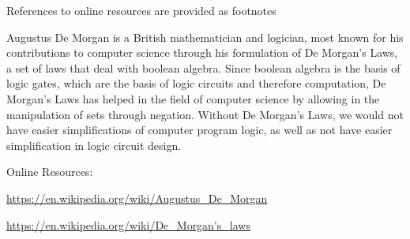 \documentclass{article}
\begin{document}
\clearpage
\header
\item[] References to online resources are provided as footnotes
\item[]Augustus De Morgan is a British mathematician and logician, most known for his contributions to computer science through his formulation of De Morgan's Laws, a set of laws that deal with boolean algebra. Since boolean algebra is the basis of logic gates, which are the basis of logic circuits and therefore computation, De Morgan's Laws has helped in the field of computer science by allowing in the manipulation of sets through negation. Without De Morgan's Laws, we would not have easier simplifications of computer program logic, as well as not have easier simplification in logic circuit design.
\item[]
\item[]
\item[] 
\item[]
\item[] 
\item[] 
\item[]
\item[] 
\item[] 
\item[]
\item[] 
\item[] 
\item[]Online Resources:
\item[]\url{https://en.wikipedia.org/wiki/Augustus_De_Morgan}
\item[]\url{https://en.wikipedia.org/wiki/De_Morgan's_laws}
\end{document}
